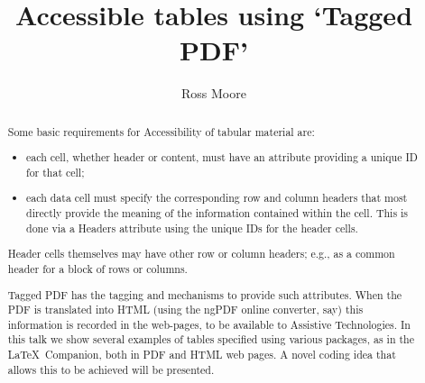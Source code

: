 \documentclass{ltugboat}
\title{Accessible tables using `Tagged PDF'}
\author{Ross Moore}
\begin{document}
\maketitle

\begin{abstract}
Some basic requirements for Accessibility of tabular material are:
\begin{itemize}
\item 
 each cell, whether header or content, must have an attribute providing
 a unique ID for that cell;
\item 
 each data cell must specify the corresponding row and column headers
 that most directly provide the meaning of the information contained within the cell.
 This is done via a \textsf{Headers} attribute using the unique IDs for the header cells.
\end{itemize}
Header cells themselves may have other row or column headers; e.g., as a common header for a block of rows or columns.

Tagged PDF has the tagging and mechanisms to provide such attributes.
When the PDF is translated into HTML (using the  \textsf{ngPDF} online converter, say) this information
is recorded in the web-pages, to be available to Assistive Technologies.
In this talk we show several examples of tables specified using various packages, as in the \LaTeX\ Companion,
both in PDF and HTML web pages. 
A novel coding idea that allows this to be achieved will be presented.

\end{abstract}

\makesignature
\end{document}
